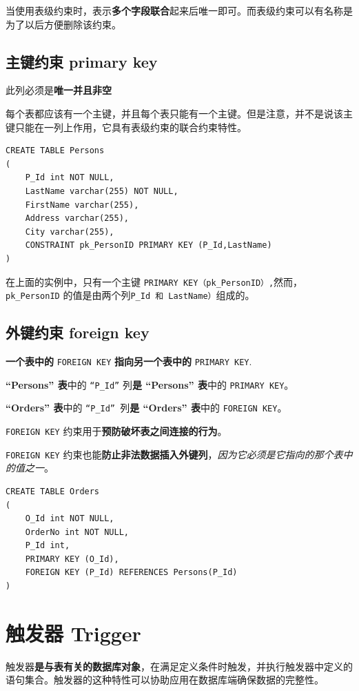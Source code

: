 \documentclass[UTF8,a4paper,12pt]{ctexbook}
\begin{document}
			当使用表级约束时，表示\textbf{多个字段联合}起来后唯一即可。而表级约束可以有名称是为了以后方便删除该约束。
			
		\subsection{主键约束 primary key}
			此列必须是\textbf{唯一并且非空}
			
			每个表都应该有一个主键，并且每个表只能有一个主键。但是注意，并不是说该主键只能在一列上作用，它具有表级约束的联合约束特性。
			\begin{lstlisting}
CREATE TABLE Persons
(
	P_Id int NOT NULL,
	LastName varchar(255) NOT NULL,
	FirstName varchar(255),
	Address varchar(255),
	City varchar(255),
	CONSTRAINT pk_PersonID PRIMARY KEY (P_Id,LastName)
)

			\end{lstlisting}
			在上面的实例中，只有一个主键 \verb|PRIMARY KEY（pk_PersonID）,|然而，\verb|pk_PersonID| 的值是由两个列\verb|P_Id 和 LastName）|组成的。
			
		\subsection{外键约束 foreign key}
			\textbf{一个表中的} \verb|FOREIGN KEY| \textbf{指向另一个表中的} \verb|PRIMARY KEY|.
			
			\textbf{“Persons” 表}中的 \verb|“P_Id”| 列\textbf{是 “Persons” 表}中的 \verb|PRIMARY KEY|。
			
			\textbf{“Orders” 表}中的 \verb|“P_Id” |列\textbf{是 “Orders” 表}中的 \verb|FOREIGN KEY|。
			
			\verb|FOREIGN KEY| 约束用于\textbf{预防破坏表之间连接的行为}。
			
			\verb|FOREIGN KEY| 约束也能\textbf{防止非法数据插入外键列}，\textit{因为它必须是它指向的那个表中的值之一}。
			
			\begin{lstlisting}
CREATE TABLE Orders
(
	O_Id int NOT NULL,
	OrderNo int NOT NULL,
	P_Id int,
	PRIMARY KEY (O_Id),
	FOREIGN KEY (P_Id) REFERENCES Persons(P_Id)
)
			\end{lstlisting}
	
	
	
	\section{触发器 Trigger}
		触发器\textbf{是与表有关的数据库对象}，在满足定义条件时触发，并执行触发器中定义的语句集合。触发器的这种特性可以协助应用在数据库端确保数据的完整性。
	
\end{document}
